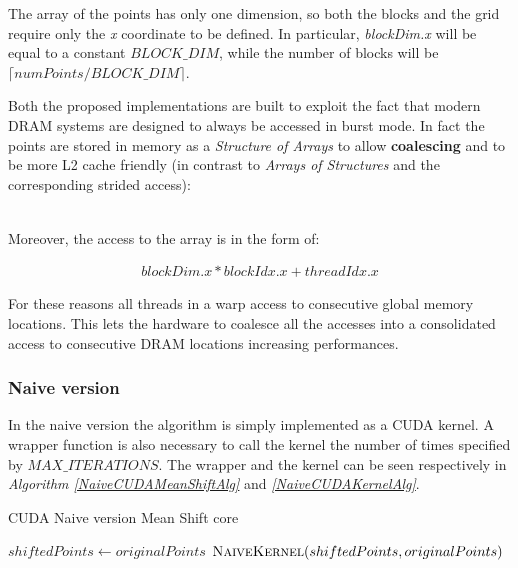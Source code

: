 \documentclass[10pt,twocolumn,letterpaper]{article}
\begin{document}
The array of the points has only one dimension, so both the blocks and the grid require only the \emph{x} coordinate to be defined. In particular, \emph{blockDim.x} will be equal to a constant $BLOCK\_DIM$, while the number of blocks will be $\lceil numPoints / BLOCK\_DIM \rceil$.

Both the proposed implementations are built to exploit the fact that modern DRAM systems are designed to always be accessed in burst mode. In fact the points are stored in memory as a \emph{Structure of Arrays} to allow \textbf{coalescing} and to be more L2 cache friendly (in contrast to \emph{Arrays of Structures} and the corresponding strided access):

\begin{align}
[x_{}, \ldots , x_{n}, y_{1}, \ldots, y_{n}, z_{1}, \ldots , z_{n}]
\end{align}

Moreover, the access to the array is in the form of:

\begin{align}
blockDim.x*blockIdx.x+threadIdx.x
\end{align}

For these reasons all threads in a warp access to consecutive global memory locations. This lets the hardware to coalesce all the accesses into a consolidated access to consecutive DRAM locations increasing performances.


\subsubsection{Naive version}
\label{naiveSection}
In the naive version the algorithm is simply implemented as a CUDA kernel. A wrapper function is also necessary to call the kernel the number of times specified by $MAX\_ITERATIONS$. The wrapper and the kernel can be seen respectively in \emph{Algorithm \ref{NaiveCUDAMeanShiftAlg}} and \emph{\ref{NaiveCUDAKernelAlg}}.

\begin{algorithm}
\caption{CUDA Naive version Mean Shift core}
\label{NaiveCUDAMeanShiftAlg}
\begin{algorithmic}
	\State$shiftedPoints \gets originalPoints$
    		\State $\Call{NaiveKernel}{shiftedPoints, originalPoints}$
    \EndWhile
\EndFunction
\end{algorithmic}
\end{algorithm}
\end{document}
